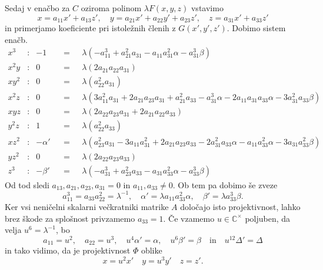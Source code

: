 \documentclass[mat1]{fmfdelo}
\numberwithin{equation}{section}
\newcommand{\CM}{\mathbb C ^\times}
\newcommand{\inv}{^{-1}}
\theoremstyle{definition}
\begin{document}
\begin{dokaz}
    Sedaj v enačbo za $C$ oziroma polinom $\lambda F(x,y,z)$ vstavimo 
    \[
        x = a_{11}x' + a_{13}z', \quad y = a_{21}x' + a_{22}y' + a_{23}z', \quad z = a_{31}x' + a_{33}z' 
    \]
    in primerjamo koeficiente pri istoležnih členih z $G(x', y', z')$. Dobimo sistem enačb.
    \begin{align*}
        x^3 &: & -1 && = \text{ }& \lambda (-a_{11}^3 + a_{21}^2 a_{31} - a_{11} a_{31}^2 \alpha - a_{31}^3 \beta) \\
        x^2y &: & 0 && = \text{ }& \lambda (2 a_{21} a_{22} a_{31}) \\
        xy^2 &: & 0 && = \text{ }& \lambda (a_{22}^2 a_{31}) \\
        x^2z &: & 0 && = \text{ }& \lambda (3 a_{11}^2 a_{31} + 2 a_{21} a_{23} a_{31} + a_{21}^2 a_{33} - 
        a_{31}^3 \alpha - 2 a_{11} a_{31} a_{33} \alpha - 3 a_{31}^2 a_{33} \beta) \\
        xyz  &: & 0 && = \text{ }& \lambda (2 a_{22} a_{23} a_{31} + 2 a_{21} a_{22} a_{33}) \\
        y^2z &: & 1 && = \text{ }& \lambda (a_{22}^2 a_{33}) \\
        xz^2 &: & -\alpha' && = \text{ }& \lambda (a_{23}^2 a_{31} - 3 a_{11} a_{31}^2 + 2 a_{21} a_{23} a_{33} - 
        2 a_{31}^2 a_{33} \alpha - a_{11} a_{33}^2 \alpha - 3 a_{31} a_{33}^2 \beta) \\
        yz^2 &: & 0 && = \text{ }& \lambda (2 a_{22} a_{23} a_{33} ) \\
        z^3 &: & -\beta' && = \text{ }& \lambda (-a_{31}^3 + a_{23}^2 a_{33} - a_{31} a_{33}^2 \alpha - a_{33}^3 \beta)
    \end{align*}
    Od tod sledi $a_{13}, a_{21}, a_{23}, a_{31} = 0$ in $a_{11}, a_{33} \neq 0$. Ob tem pa dobimo še zveze
    \[
        a_{11}^3 = a_{33}a_{22}^2 = \lambda\inv, \quad \alpha' = \lambda a_{11}a_{33}^2 \alpha, \quad \beta' = \lambda a_{33}^3 \beta.
    \]
    Ker vsi neničelni skalarni večkratniki matrike $A$ določajo isto projektivnost, lahko brez škode za splošnost privzamemo $a_{33} = 1$. Če vzamemo $u \in \CM$ poljuben, da velja $u^6 = \lambda\inv$, bo 
    \[
        a_{11} = u^2, \quad a_{22} = u^3, \quad u^4\alpha' = \alpha, \quad u^6 \beta' = \beta \quad \text{in} \quad u^{12} \Delta' = \Delta
    \]
    in tako vidimo, da je projektivnost $\Phi$ oblike
    \[
        x = u^2 x' \quad y = u^3 y' \quad z = z'.
    \]
\end{dokaz}
\end{document}
